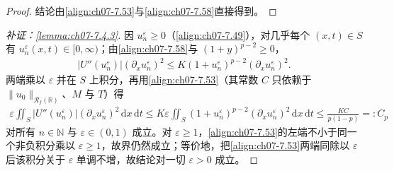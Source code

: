 ﻿\documentclass[../../main.tex]{subfiles}%
\begin{document}
\begin{proof}
结论由\eqref{align:ch07-7.53}与\eqref{align:ch07-7.58}直接得到。
\end{proof}

\begin{proof}[补证：\cref{lemma:ch07-7.4.3}]
因 $u_n^\varepsilon\geqslant0$（\eqref{align:ch07-7.49}），对几乎每个 $(x,t)\in S$ 有 $u_n^\varepsilon(x,t)\in[0,\infty)$；由\eqref{align:ch07-7.58}与 $(1+y)^{p-2}\geqslant0$，
\begin{align*}
|U''(u_n^\varepsilon)|(\partial_xu_n^\varepsilon)^2\leqslant K(1+u_n^\varepsilon)^{p-2}(\partial_xu_n^\varepsilon)^2.
\end{align*}
两端乘以 $\varepsilon$ 并在 $S$ 上积分，再用\eqref{align:ch07-7.53}（其常数 $C$ 只依赖于 $\|u_0\|_{\mathscr{R}_f(\mathbb{R})}$、$M$ 与 $T$）得
\begin{align*}
\varepsilon\iint_S|U''(u_n^\varepsilon)|(\partial_xu_n^\varepsilon)^2\,\mathrm{d}x\,\mathrm{d}t
\leqslant K\varepsilon\iint_S(1+u_n^\varepsilon)^{p-2}(\partial_xu_n^\varepsilon)^2\,\mathrm{d}x\,\mathrm{d}t
\leqslant\frac{KC}{p(1-p)}=:C_p
\end{align*}
对所有 $n\in\mathbb{N}$ 与 $\varepsilon\in(0,1)$ 成立。对 $\varepsilon\geqslant1$，\eqref{align:ch07-7.53}的左端不小于同一个非负积分乘以 $\varepsilon\geqslant1$，故界仍然成立；等价地，把\eqref{align:ch07-7.53}两端同除以 $\varepsilon$ 后该积分关于 $\varepsilon$ 单调不增，故结论对一切 $\varepsilon>0$ 成立。
\end{proof}
\end{document}
